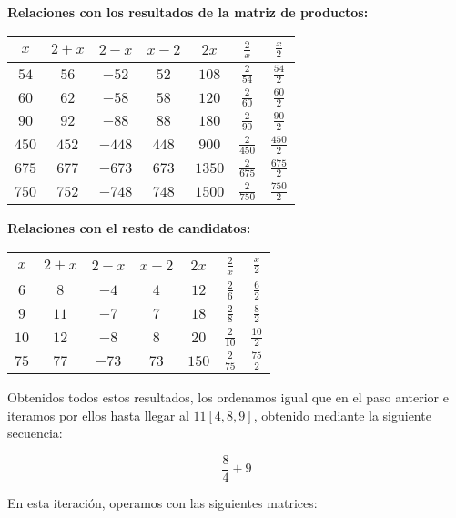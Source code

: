 \begin{center}
\textbf{Relaciones con los resultados de la matriz de productos:}

\begin{tabular}{c c c c c c c}
$x$   & $2+x$  & $2-x$  & $x-2$  & $2x$   & $\frac{2}{x}$   & $\frac{x}{2}$   \\
\midrule
$54$  & $56$   & $-52$  & $52$   & $108$  & $\frac{2}{54}$  & $\frac{54}{2}$  \\
$60$  & $62$   & $-58$  & $58$   & $120$  & $\frac{2}{60}$  & $\frac{60}{2}$  \\
$90$  & $92$   & $-88$  & $88$   & $180$  & $\frac{2}{90}$  & $\frac{90}{2}$  \\
$450$ & $452$  & $-448$ & $448$  & $900$  & $\frac{2}{450}$ & $\frac{450}{2}$ \\
$675$ & $677$  & $-673$ & $673$  & $1350$ & $\frac{2}{675}$ & $\frac{675}{2}$ \\
$750$ & $752$  & $-748$ & $748$  & $1500$ & $\frac{2}{750}$ & $\frac{750}{2}$ \\
\end{tabular}
\end{center}

\begin{center}
\textbf{Relaciones con el resto de candidatos:}

\begin{tabular}{c c c c c c c}
$x$  & $2+x$ & $2-x$ & $x-2$  & $2x$  & $\frac{2}{x}$   & $\frac{x}{2}$   \\
\midrule
$6$  & $8$   & $-4$  & $4$    & $12$  & $\frac{2}{6}$   & $\frac{6}{2}$   \\
$9$  & $11$  & $-7$  & $7$    & $18$  & $\frac{2}{8}$   & $\frac{8}{2}$   \\
$10$ & $12$  & $-8$  & $8$    & $20$  & $\frac{2}{10}$  & $\frac{10}{2}$  \\
$75$ & $77$  & $-73$ & $73$   & $150$ & $\frac{2}{75}$  & $\frac{75}{2}$  \\
\end{tabular}
\end{center}

Obtenidos todos estos resultados, los ordenamos igual que en el paso anterior e iteramos por ellos hasta llegar al  $11[4,8,9]$, obtenido mediante la siguiente secuencia:

\begin{center}
\[\frac{8}{4}+9\]
\end{center}

En esta iteración, operamos con las siguientes matrices:

